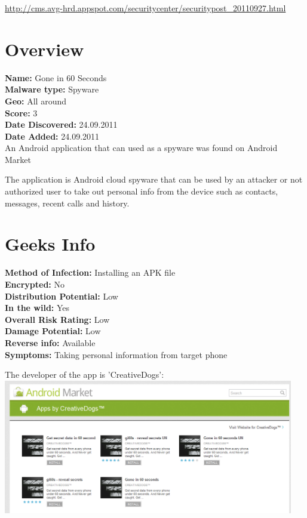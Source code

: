 \url{http://cms.avg-hrd.appspot.com/securitycenter/securitypost_20110927.html}

\section{Overview}

\textbf{Name:} Gone in 60 Seconds \\
\textbf{Malware type:} Spyware \\
\textbf{Geo:} All around \\
\textbf{Score:} 3 \\
\textbf{Date Discovered:} 24.09.2011 \\
\textbf{Date Added:} 24.09.2011 \\

An Android application that can used as a spyware was found on Android Market

The application is Android cloud spyware that can be used by an attacker or not authorized user to take out personal info from the device such as contacts, messages, recent calls and history.

\section{Geeks Info}

\textbf{Method of Infection:} Installing an APK file \\
\textbf{Encrypted:} No \\
\textbf{Distribution Potential:} Low \\
\textbf{In the wild:} Yes \\
\textbf{Overall Risk Rating:} Low \\
\textbf{Damage Potential:} Low \\
\textbf{Reverse info:} Available \\
\textbf{Symptoms:} Taking personal information from target phone \\

\parbox{\textwidth}{
The developer of the app is 'CreativeDogs': \\
\includegraphics[width=0.95\textwidth]{figs/gone60_1.png}
}

